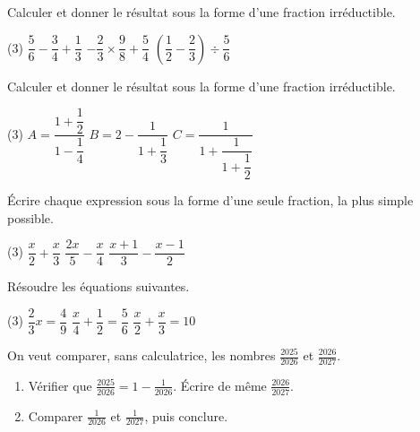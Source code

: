 \documentclass[a4paper,11pt,fleqn]{article}
\begin{document}

\begin{EXO}{}{}
Calculer et donner le résultat sous la forme d'une fraction irréductible.

\begin{tasks}(3)
	\task $\dfrac{5}{6} - \dfrac{3}{4} + \dfrac{1}{3}$
	\task $-\dfrac{2}{3} \times \dfrac{9}{8} + \dfrac{5}{4}$
	\task $\left(\dfrac{1}{2} - \dfrac{2}{3}\right) \div \dfrac{5}{6}$
\end{tasks}
\end{EXO}

\begin{EXO}{}{}
Calculer et donner le résultat sous la forme d'une fraction irréductible.

\begin{tasks}(3)
	\task $A = \dfrac{1 + \dfrac{1}{2}}{1 - \dfrac{1}{4}}$
	\task $B = 2 - \dfrac{1}{1 + \dfrac{1}{3}}$
	\task $C = \dfrac{1}{1 + \dfrac{1}{1 + \dfrac{1}{2}}}$
\end{tasks}
\end{EXO}

\begin{EXO}{}{}
Écrire chaque expression sous la forme d'une seule fraction, la plus simple possible.

\begin{tasks}(3)
	\task $\dfrac{x}{2} + \dfrac{x}{3}$
	\task $\dfrac{2x}{5} - \dfrac{x}{4}$
	\task $\dfrac{x + 1}{3} - \dfrac{x - 1}{2}$
\end{tasks}
\end{EXO}

\begin{EXO}{}{}
Résoudre les équations suivantes.

\begin{tasks}(3)
	\task $\dfrac{2}{3}x = \dfrac{4}{9}$
	\task $\dfrac{x}{4} + \dfrac{1}{2} = \dfrac{5}{6}$
	\task $\dfrac{x}{2} + \dfrac{x}{3} = 10$
\end{tasks}
\end{EXO}

\begin{EXO}{}{}
On veut comparer, sans calculatrice, les nombres $\frac{2025}{2026}$ et $\frac{2026}{2027}$.

\begin{enumerate}
	\item Vérifier que $\frac{2025}{2026} = 1 - \frac{1}{2026}$. Écrire de même $\frac{2026}{2027}$.
	\item Comparer $\frac{1}{2026}$ et $\frac{1}{2027}$, puis conclure.
\end{enumerate}
\end{EXO}
\end{document}
